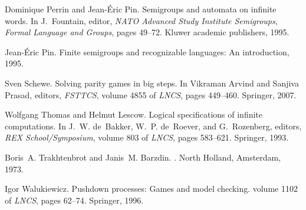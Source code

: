 \documentclass[fleqn,envcountsame]{LMCS}
\begin{document}
\begin{thebibliography}{10}
Dominique Perrin and Jean{-}{\'E}ric Pin.
\newblock Semigroups and automata on infinite words.
\newblock In J.~Fountain, editor, {\em NATO Advanced Study Institute {\it
  Semigroups, Formal Language and Groups}}, pages 49--72. Kluwer academic
  publishers, 1995.

Jean{-}\'{E}ric Pin.
\newblock Finite semigroups and recognizable languages: An introduction, 1995.

Sven Schewe.
\newblock Solving parity games in big steps.
\newblock In Vikraman Arvind and Sanjiva Prasad, editors, {\em FSTTCS}, volume
  4855 of {\em LNCS}, pages 449--460. Springer, 2007.

Wolfgang Thomas and Helmut Lescow.
\newblock Logical specifications of infinite computations.
\newblock In J.~W. de~Bakker, W.~P. de~Roever, and G.~Rozenberg, editors, {\em
  REX School/Symposium}, volume 803 of {\em LNCS}, pages 583--621. Springer,
  1993.

Boris~A. Trakhtenbrot and Janis~M. Barzdin.
.
\newblock North Holland, Amsterdam, 1973.

Igor Walukiewicz.
\newblock Pushdown processes: Games and model checking.
\newblock volume 1102 of {\em LNCS}, pages 62--74. Springer, 1996.

\end{thebibliography}
\end{document}
